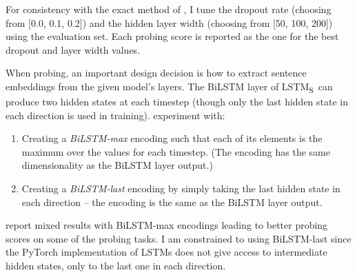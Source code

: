 \documentclass[bsc,frontabs,twoside,singlespacing,parskip,deptreport]{infthesis}
\def\LSTMS{LSTM\textsubscript{S}}
\begin{document}
{{{      For consistency with the exact method of \citeauthor{Conneau_2018}, I tune the dropout rate (choosing from [0.0, 0.1, 0.2]) and the hidden layer width (choosing from [50, 100, 200]) using the evaluation set. Each probing score is reported as the one for the best dropout and layer width values.

      When probing, an important design decision is how to extract sentence embeddings from the given model's layers.
      The BiLSTM layer of \LSTMS~can produce two hidden states at each timestep (though only the last hidden state in each direction is used in training). \citeauthor{Conneau_2018} experiment with:
      \begin{enumerate}
        \item Creating a \textit{BiLSTM-max} encoding such that each of its elements is the maximum over the values for each timestep. (The encoding has the same dimensionality as the BiLSTM layer output.)
        \item Creating a \textit{BiLSTM-last} encoding by simply taking the last hidden state in each direction -- the encoding is the same as the BiLSTM layer output.
      \end{enumerate}
      \citeauthor{Conneau_2018} report mixed results with BiLSTM-max encodings leading to better probing scores on some of the probing tasks. I am constrained to using BiLSTM-last since the PyTorch implementation of LSTMs does not give access to intermediate hidden states, only to the last one in each direction.

}}}
\end{document}

